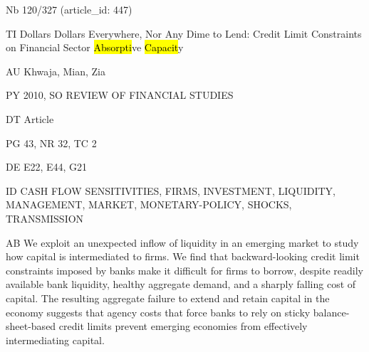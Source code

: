 \documentclass[a4paper]{article}
\begin{document}
\vspace*{-2cm}
Nb \tabto{0cm}120/327 (article\_id: 447)\par
TI \tabto{0cm}Dollars Dollars Everywhere, Nor Any Dime to Lend: Credit Limit Constraints on Financial Sector \hl{Absorpti}ve \hl{Capacit}y\par
AU \tabto{0cm}Khwaja, Mian, Zia\par
PY \tabto{0cm}2010, SO REVIEW OF FINANCIAL STUDIES\par
DT \tabto{0cm}Article\par
PG \tabto{0cm}43, NR 32, TC 2\par
DE \tabto{0cm}E22, E44, G21\par
ID \tabto{0cm}CASH FLOW SENSITIVITIES, FIRMS, INVESTMENT, LIQUIDITY, MANAGEMENT, MARKET, MONETARY-POLICY, SHOCKS, TRANSMISSION\par
AB \tabto{0cm}We exploit an unexpected inflow of liquidity in an emerging market to study how capital is intermediated to firms. We find that backward-looking credit limit constraints imposed by banks make it difficult for firms to borrow, despite readily available bank liquidity, healthy aggregate demand, and a sharply falling cost of capital. The resulting aggregate failure to extend and retain capital in the economy suggests that agency costs that force banks to rely on sticky balance-sheet-based credit limits prevent emerging economies from effectively intermediating capital.\par
\clearpage
\end{document}

